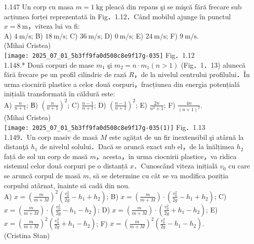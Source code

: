 1.147 Un corp cu masa $m=1 \mathrm{~kg}$ pleacă din repaus şi se mişcă fără frecare sub acțiunea forței reprezentată în Fig．1.12．Când mobilul ajunge în punctul $x=8 \mathrm{~m}$，viteza lui va fi:\\ A) $4 \mathrm{~m} / \mathrm{s}$; B) $18 \mathrm{~m} / \mathrm{s}$; C) $36 \mathrm{~m} / \mathrm{s}$; D) $0 \mathrm{~m} / \mathrm{s}$; E) $24 \mathrm{~m} / \mathrm{s}$; F) $9 \mathrm{~m} / \mathrm{s}$.\\ (Mihai Cristea)\\ \texttt{[image: 2025\_07\_01\_5b3ff9fa0d508c8e9f17g-035]} Fig．1.12\\

1.148.* Două corpuri de mase $m_{1}$ şi $m_{2}=n \cdot m_{1}(n>1)$ (Fig．1．13) alunecă fără frecare pe un profil cilindric de rază $R$，de la nivelul centrului profilului．În urma ciocnirii plastice a celor două corpuri，fracțiunea din energia potențială inițială transformată în căldură este:\\ A) $\frac{n}{n+1}$; В) $\left(\frac{n}{n+1}\right)^{2}$; C) $\frac{n-1}{n+1}$; D) $\left(\frac{n-1}{n+1}\right)^{2}$; E) $\frac{2 n}{n^{2}+1}$; F) $\frac{4 n}{(n+1)^{2}}$. \\ (Mihai Cristea)\\ \texttt{[image: 2025\_07\_01\_5b3ff9fa0d508c8e9f17g-035(1)]} Fig．1.13\\

1.149．Un corp masiv de masă $M$ este agățat de un fir inextensibil şi atârnă la distanţă $h_{1}$ de nivelul solului．Dacă se aruncă exact sub el，de la înălțimea $h_{2}$ fațã de sol un corp de masă $m$，acesta，în urma ciocnirii plastice，va ridica sistemul celor două corpuri pe o distanță $x$．Cunoscând viteza inițială $v_{0}$ cu care se aruncă corpul de masă $m$, să se determine cu cât se va modifica poziția corpului atârnat, înainte să cadă din nou.\\ A) $x=\left(\frac{m}{m+M}\right)^{2}\left(\frac{v_{0}^{2}}{2 g}-h_{1}+h_{2}\right)$; B) $x=\left(\frac{m}{m+M}\right) \cdot\left(\frac{v_{0}^{2}}{2 g}-h_{1}+h_{2}\right)$; C) $x=\left(\frac{m}{m+M}\right) \cdot\left(\frac{v_{0}^{2}}{2 g}-h_{1}-h_{2}\right)$; D) $x=\left(\frac{m}{m+M}\right) \cdot\left(\frac{v_{0}^{2}}{2 g}+h_{1}-h_{2}\right)$; E) $x=\left(\frac{m}{m+M}\right)^{2}\left(\frac{v_{0}^{2}}{2 g}+h_{1}-h_{2}\right)$; F) $x=\left(\frac{m}{m+M}\right)^{2}\left(\frac{v_{0}^{2}}{2 g}-h_{1}-h_{2}\right)$.\\ (Cristina Stan)\\

